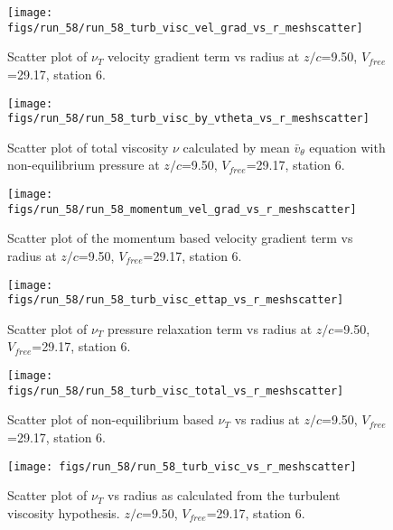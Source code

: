 \begin{figure}[H]
\centering
\texttt{[image: figs/run\_58/run\_58\_turb\_visc\_vel\_grad\_vs\_r\_meshscatter]}
\caption{Scatter plot of $\nu_T$ velocity gradient term vs radius at $z/c$=9.50, $V_{free}$=29.17, station 6.}
\end{figure}


\begin{figure}[H]
\centering
\texttt{[image: figs/run\_58/run\_58\_turb\_visc\_by\_vtheta\_vs\_r\_meshscatter]}
\caption{Scatter plot of total viscosity $\nu$ calculated by mean $\bar{v}_{\theta}$ equation with non-equilibrium pressure at $z/c$=9.50, $V_{free}$=29.17, station 6.}
\end{figure}


\begin{figure}[H]
\centering
\texttt{[image: figs/run\_58/run\_58\_momentum\_vel\_grad\_vs\_r\_meshscatter]}
\caption{Scatter plot of the momentum based velocity gradient term vs radius at $z/c$=9.50, $V_{free}$=29.17, station 6.}
\end{figure}


\begin{figure}[H]
\centering
\texttt{[image: figs/run\_58/run\_58\_turb\_visc\_ettap\_vs\_r\_meshscatter]}
\caption{Scatter plot of $\nu_T$ pressure relaxation term vs radius at $z/c$=9.50, $V_{free}$=29.17, station 6.}
\end{figure}


\begin{figure}[H]
\centering
\texttt{[image: figs/run\_58/run\_58\_turb\_visc\_total\_vs\_r\_meshscatter]}
\caption{Scatter plot of non-equilibrium based $\nu_T$ vs radius at $z/c$=9.50, $V_{free}$=29.17, station 6.}
\end{figure}


\begin{figure}[H]
\centering
\texttt{[image: figs/run\_58/run\_58\_turb\_visc\_vs\_r\_meshscatter]}
\caption{Scatter plot of $\nu_T$ vs radius as calculated from the turbulent viscosity hypothesis. $z/c$=9.50, $V_{free}$=29.17, station 6.}
\end{figure}


